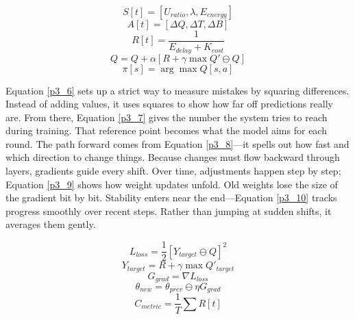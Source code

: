 \documentclass[a4paper,fleqn]{cas-dc}
\numberwithin{equation}{section}
\begin{document}
\begin{equation} S[t] = [ U_{ratio}, \lambda, E_{energy} ] \label{p3_1} \end{equation}
\begin{equation} A[t] = [ \Delta Q, \Delta T, \Delta B ] \label{p3_2} \end{equation}
\begin{equation} R[t] = \frac{1}{E_{delay} + K_{cost}} \label{p3_3} \end{equation}
\begin{equation} Q = Q + \alpha [ R + \gamma \max Q' \ominus Q ] \label{p3_4} \end{equation}
\begin{equation} \pi[s] = \arg\max Q[s, a] \label{p3_5} \end{equation}

Equation \ref{p3_6} sets up a strict way to measure mistakes by squaring differences. Instead of adding values, it uses squares to show how far off predictions really are. From there, Equation \ref{p3_7} gives the number the system tries to reach during training. That reference point becomes what the model aims for each round. The path forward comes from Equation \ref{p3_8}—it spells out how fast and which direction to change things. Because changes must flow backward through layers, gradients guide every shift. Over time, adjustments happen step by step; Equation \ref{p3_9} shows how weight updates unfold. Old weights lose the size of the gradient bit by bit. Stability enters near the end—Equation \ref{p3_10} tracks progress smoothly over recent steps. Rather than jumping at sudden shifts, it averages them gently.

\begin{equation} L_{loss} = \frac{1}{2} [ Y_{target} \ominus Q ]^{2} \label{p3_6} \end{equation}
\begin{equation} Y_{target} = R + \gamma \max Q'_{target} \label{p3_7} \end{equation}
\begin{equation} G_{grad} = \nabla L_{loss} \label{p3_8} \end{equation}
\begin{equation} \theta_{new} = \theta_{prev} \ominus \eta G_{grad} \label{p3_9} \end{equation}
\begin{equation} C_{metric} = \frac{1}{T} \sum R[t] \label{p3_10} \end{equation}
\end{document}

